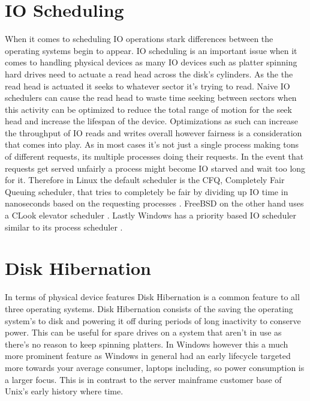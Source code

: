 \documentclass[letterpaper,10pt,draftclsnofoot,onecolumn]{IEEEtran}
\begin{document}
\section{IO Scheduling}
When it comes to scheduling IO operations stark differences between the operating systems begin to appear. IO scheduling is an important issue when it comes to handling physical devices as many IO devices such as platter spinning hard drives need to actuate a read head across the disk’s cylinders. As the the read head is actuated it seeks to whatever sector it’s trying to read. Naive IO schedulers can cause the read head to waste time seeking between sectors when this activity can be optimized to reduce the total range of motion for the seek head and increase the lifespan of the device. Optimizations as such can increase the throughput of IO reads and writes overall however fairness is a consideration that comes into play. As in most cases it’s not just a single process making tons of different requests, its multiple processes doing their requests. In the event that requests get served unfairly a process might become IO starved and wait too long for it. Therefore in Linux the default scheduler is the CFQ, Completely Fair Queuing scheduler, that tries to completely be fair by dividing up IO time in nanoseconds based on the requesting processes \cite{love}. FreeBSD on the other hand uses a CLook elevator scheduler \cite{mccusick}. Lastly Windows has a priority based IO scheduler similar to its process scheduler \cite{russinovich}.\\
\section{Disk Hibernation}
In terms of physical device features Disk Hibernation is a common feature to all three operating systems. Disk Hibernation consists of the saving the operating system’s to disk and powering it off during periods of long inactivity to conserve power. This can be useful for spare drives on a system that aren’t in use as there’s no reason to keep spinning platters. In Windows however this a much more prominent feature as Windows in general had an early lifecycle targeted more towards your average consumer, laptops including, so power consumption is a larger focus. This is in contrast to the server mainframe customer base of Unix’s early history where time.\\
\newpage
\end{document}
